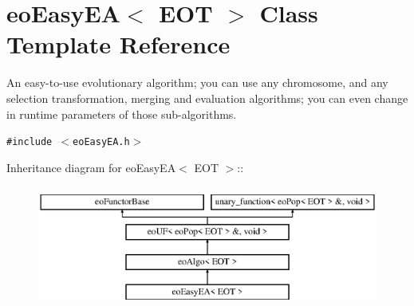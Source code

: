 \section{eo\-Easy\-EA$<$ EOT $>$ Class Template Reference}
\label{classeo_easy_e_a}
An easy-to-use evolutionary algorithm; you can use any chromosome, and any selection transformation, merging and evaluation algorithms; you can even change in runtime parameters of those sub-algorithms.  


{\tt \#include $<$eo\-Easy\-EA.h$>$}

Inheritance diagram for eo\-Easy\-EA$<$ EOT $>$::\begin{figure}[H]
\begin{center}
\leavevmode
\includegraphics[height=4cm]{classeo_easy_e_a}
\end{center}
\end{figure}
